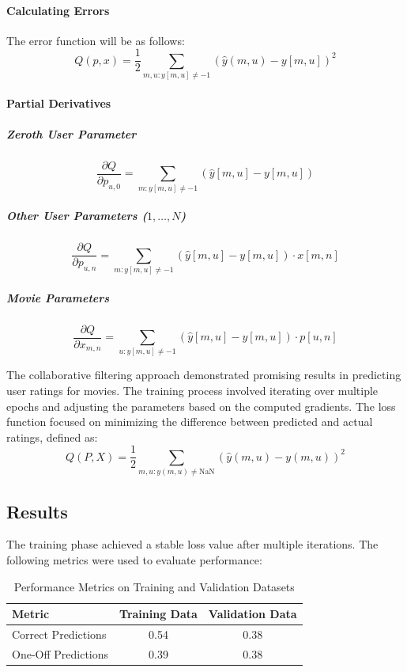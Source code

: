 \documentclass[a4paper,9pt]{article}
\begin{document}
\paragraph{Calculating Errors}
The error function will be as follows:
\begin{equation}
	Q(p,x) = \frac{1}{2} \sum_{m,u : y[m,u] \neq -1} (\hat{y}(m,u) - y[m,u])^2 \tag{11}
\end{equation}

\paragraph{Partial Derivatives}
\subparagraph{Zeroth User Parameter}
\begin{equation}
	\frac{\partial Q}{\partial p_{u,0}} = \sum_{m : y[m,u] \neq -1} (\hat{y}[m,u] - y[m,u]) \tag{12}
\end{equation}

\subparagraph{Other User Parameters (\(1, \ldots, N\))}
\begin{equation}
	\frac{\partial Q}{\partial p_{u,n}} = \sum_{m : y[m,u] \neq -1} (\hat{y}[m,u] - y[m,u]) \cdot x[m,n] \tag{13}
\end{equation}

\subparagraph{Movie Parameters}
\begin{equation}
	\frac{\partial Q}{\partial x_{m,n}} = \sum_{u : y[m,u] \neq -1} (\hat{y}[m,u] - y[m,u]) \cdot p[u,n] \tag{14}
\end{equation}

The collaborative filtering approach demonstrated promising results in predicting user ratings for movies. The training process involved iterating over multiple epochs and adjusting the parameters based on the computed gradients. The loss function focused on minimizing the difference between predicted and actual ratings, defined as:
\begin{equation}
	Q(P, X) = \frac{1}{2} \sum_{m,u : y(m,u) \neq \text{NaN}} \left( \hat{y}(m,u) - y(m,u) \right)^2 \tag{15}
\end{equation}
\subsection{Results}
The training phase achieved a stable loss value after multiple iterations.
The following metrics were used to evaluate performance:

\begin{table}[h]
	\centering
	\begin{tabular}{|l|c|c|}
		\hline
		\textbf{Metric}     & \textbf{Training Data} & \textbf{Validation Data} \\ \hline
		Correct Predictions & 0.54                   & 0.38                     \\ \hline
		One-Off Predictions & 0.39                   & 0.38                     \\ \hline
	\end{tabular}
	\caption{Performance Metrics on Training and Validation Datasets}
	\label{tab:predictions_metrics}
\end{table}
\end{document}
